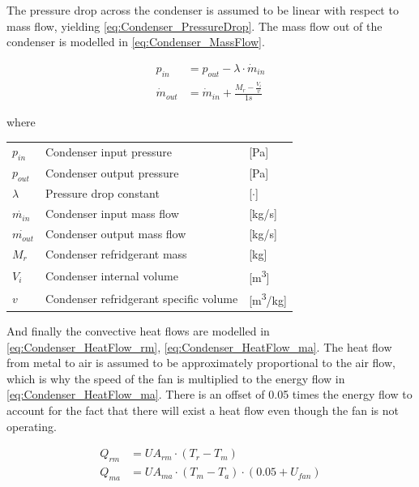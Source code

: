 The pressure drop across the condenser is assumed to be linear with respect to mass flow, yielding \cref{eq:Condenser_PressureDrop}.
The mass flow out of the condenser is modelled in \cref{eq:Condenser_MassFlow}.


\begin{align}
	p_{in} 	& =  p_{out} - \lambda \cdot \dot{m}_{in}  				\label{eq:Condenser_PressureDrop}\\
	\dot{m}_{out}		& = \dot{m}_{in} + \frac{M_r - \frac{V_i}{v}}{1s}		\label{eq:Condenser_MassFlow}
\end{align}

where

\begin{center}
	\begin{tabular}{l p{8cm} l}
		$p_{in}$				&	Condenser input pressure					& [\si{Pa}] \\
		$p_{out}$				&	Condenser output pressure					& [\si{Pa}] \\
		$\lambda$				& 	Pressure drop constant	 					& [$\cdot$] \\
		$\dot{m_{in}}$			& 	Condenser input mass flow 					& [\si{kg}/\si{s}] \\
		$\dot{m_{out}}$			& 	Condenser output mass flow 					& [\si{kg}/\si{s}] \\
		$M_{r}$					&	Condenser refridgerant mass					& [\si{kg}] \\
		$V_{i}$					&	Condenser internal volume					& [\si{m^3}] \\
		$v$						&	Condenser refridgerant specific volume		& [\si{m^3}/\si{kg}] \\
	\end{tabular}
\end{center}


And finally the convective heat flows are modelled in \cref{eq:Condenser_HeatFlow_rm}, \cref{eq:Condenser_HeatFlow_ma}. The heat flow from metal to air is assumed to be approximately proportional to the air flow, which is why the speed of the fan is multiplied to the energy flow in \cref{eq:Condenser_HeatFlow_ma}. There is an offset of 0.05 times the energy flow to account for the fact that there will exist a heat flow even though the fan is not operating.

\begin{align}
	Q_{rm}	 			& = U A_{rm} \cdot (T_r - T_m)							\label{eq:Condenser_HeatFlow_rm}\\
	Q_{ma}	 			& = U A_{ma} \cdot (T_m - T_a)\cdot (0.05 + U_{fan})				\label{eq:Condenser_HeatFlow_ma}
\end{align}


